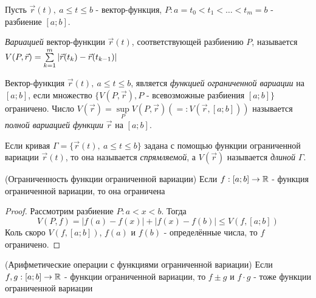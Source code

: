 \begin{definition}
	Пусть $\vec{r}(t),\ a \le t \le b$ - вектор-функция, $P: a = t_0 < t_1 < \ldots < t_m = b$ - разбиение $[a; b]$.
	
	\textit{Вариацией} вектор-функции $\vec{r}(t)$, соответствующей разбиению $P$, называется $V(P, \vec{r}) = \sum\limits_{k = 1}^m |\vec{r}(t_k) - \vec{r}(t_{k - 1})|$
\end{definition}

\begin{definition}
	Вектор-функция $\vec{r}(t),\ a \le t \le b$, является \textit{функцией ограниченной вариации} на $[a; b]$, если множество $\{V(P, \vec{r}), P \text{ - всевозможные разбиения }[a; b]\}$ ограничено. Число $V(\vec{r}) = \sup\limits_{P} V(P, \vec{r})\left(=: V(\vec{r}, [a; b])\right)$ называется \textit{полной вариацией функции} $\vec{r}$ на $[a; b]$.
\end{definition}

\begin{definition}
	Если кривая $\Gamma = \{\vec{r}(t),\ a \le t \le b\}$ задана с помощью функции ограниченной вариации $\vec{r}(t)$, то она называется \textit{спрямляемой}, а $V(\vec{r})$ называется \textit{длиной} $\Gamma$.
\end{definition}


\begin{theorem} (Ограниченность функции ограниченной вариации)
	Если $f: [a; b] \to \mathbb{R}$ - функция ограниченной вариации, то она ограничена
\end{theorem}

\begin{proof}
	Рассмотрим разбиение $P: a < x < b$. Тогда
	\[
		V(P, f) = |f(a) - f(x)| + |f(x) - f(b)| \le V(f, [a; b])
	\]
	Коль скоро $V(f, [a; b])$, $f(a)$ и $f(b)$ - определённые числа, то $f$ ограничено.
\end{proof}

\begin{theorem} (Арифметические операции с функциями ограниченной вариации)
	Если $f, g: [a; b] \to \mathbb{R}$ - функции ограниченной вариации, то $f \pm g$ и $f \cdot g$ - тоже функции ограниченной вариации
\end{theorem}


